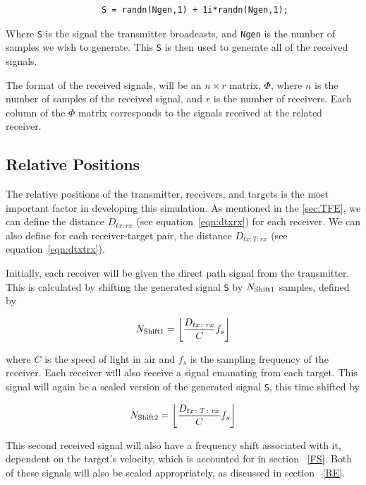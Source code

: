 \documentclass[12pt,openany,a4paper]{book}
\begin{document}
\begin{verbatim}
                   S = randn(Ngen,1) + 1i*randn(Ngen,1);
\end{verbatim}

Where \verb+S+ is the signal the transmitter broadcasts, and \verb+Ngen+ is the number of samples we wish to generate. This \verb+S+ is then used to generate all of the received signals.

\bigskip

The format of the received signals, will be an $n\times r$ matrix, $\Phi$, where $n$ is the number of samples of the received signal, and $r$ is the number of receivers. Each column of the $\Phi$ matrix corresponds to the signals received at the related receiver.

\subsection{Relative Positions}
The relative positions of the transmitter, receivers, and targets is the most important factor in developing this simulation. As mentioned in the \ref{sec:TFE}, we can define the distance $D_{tx\colon rx}$ (see equation~\ref{eqn:dtxrx}) for each receiver. We can also define for each receiver-target pair, the distance $D_{tx\colon T\colon rx}$ (see equation~\ref{eqn:dtxtrx}). 

\bigskip

Initially, each receiver will be given the direct path signal from the transmitter. This is calculated by shifting the generated signal \verb+S+ by $N_{\textnormal{Shift1}}$ samples, defined by

\begin{equation}
N_{\textnormal{Shift1}} =
\bigg\lfloor  \frac{D_{tx\colon rx}}{C} f_s \bigg\rfloor
\end{equation}

\bigskip

where $C$ is the speed of light in air and $f_s$ is the sampling frequency of the receiver. Each receiver will also receive a signal emanating from each target. This signal will again be a scaled version of the generated signal \verb+S+, this time shifted by

\begin{equation}
N_{\textnormal{Shift2}} =
\bigg\lfloor  \frac{D_{tx\colon T\colon rx}}{C} f_s \bigg\rfloor
\end{equation}

\bigskip

This second received signal will also have a frequency shift associated with it, dependent on the target's velocity, which is accounted for in section ~\ref{FS}. Both of these signals will also be scaled appropriately, as discussed in section ~\ref{RE}.
\end{document}
